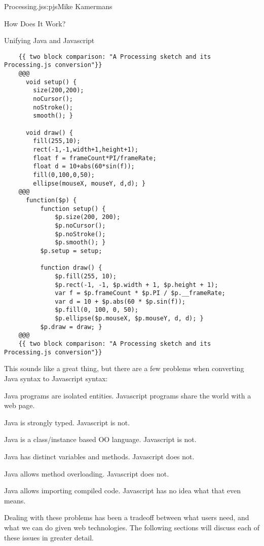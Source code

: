 \begin{aosachapter}{Processing.js}{s:pjs}{Mike Kamermans}
\begin{aosasect1}{How Does It Work?}
\begin{aosasect2}{Unifying Java and Javascript}
\begin{verbatim}
    {{ two block comparison: "A Processing sketch and its Processing.js conversion"}}
    @@@
      void setup() {
        size(200,200);
        noCursor();
        noStroke();
        smooth(); }

      void draw() {
        fill(255,10);
        rect(-1,-1,width+1,height+1);
        float f = frameCount*PI/frameRate;
        float d = 10+abs(60*sin(f));
        fill(0,100,0,50);
        ellipse(mouseX, mouseY, d,d); }
    @@@
      function($p) {
          function setup() {
              $p.size(200, 200);
              $p.noCursor();
              $p.noStroke();
              $p.smooth(); }
          $p.setup = setup;

          function draw() {
              $p.fill(255, 10);
              $p.rect(-1, -1, $p.width + 1, $p.height + 1);
              var f = $p.frameCount * $p.PI / $p.__frameRate;
              var d = 10 + $p.abs(60 * $p.sin(f));
              $p.fill(0, 100, 0, 50);
              $p.ellipse($p.mouseX, $p.mouseY, d, d); }
          $p.draw = draw; }
    @@@
    {{ two block comparison: "A Processing sketch and its Processing.js conversion"}}
\end{verbatim}

This sounds like a great thing, but there are a few problems when
converting Java syntax to Javascript syntax:

\begin{aosaenumerate}

\item Java programs are isolated entities. Javascript programs share
  the world with a web page.

\item Java is strongly typed. Javascript is not.

\item Java is a class/instance based OO language. Javascript is not.

\item Java has distinct variables and methods. Javascript does not.

\item Java allows method overloading. Javascript does not.

\item Java allows importing compiled code. Javascript has no idea what
  that even means.

\end{aosaenumerate}

Dealing with these problems has been a tradeoff between what users
need, and what we can do given web technologies. The following
sections will discuss each of these issues in greater detail.


\end{aosasect2}
\end{aosasect1}
\end{aosachapter}
